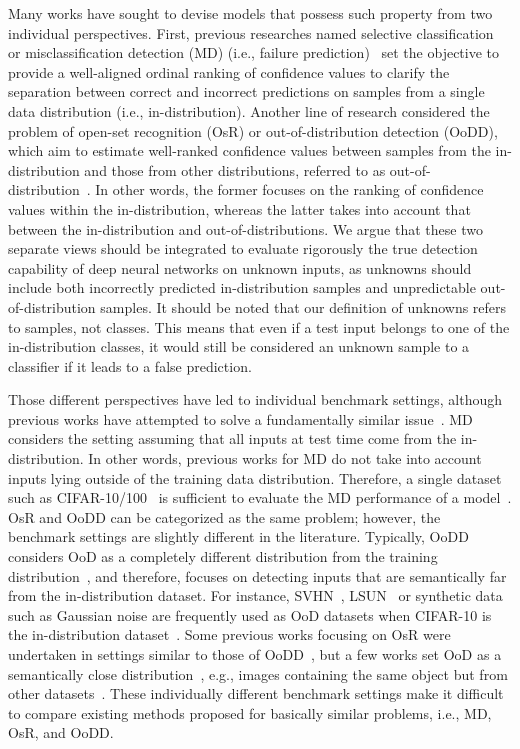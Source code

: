 \documentclass[preprint,12pt]{elsarticle}
\begin{document}
Many works have sought to devise models that possess such property from two individual perspectives. First, previous researches named selective classification~\citep{el2010selective, geifman2017selective} or misclassification detection (MD) (i.e., failure prediction)~\citep{jiang2018trust, corbiere2019addressing} set the objective to provide a well-aligned ordinal ranking of confidence values to clarify the separation between correct and incorrect predictions on samples from a single data distribution (i.e., in-distribution).
Another line of research considered the problem of open-set recognition (OsR) or out-of-distribution detection (OoDD), which aim to estimate well-ranked confidence values between samples from the in-distribution and those from other distributions, referred to as out-of-distribution~\citep{bendale2016towards, liang2017enhancing, lee2018simple}. In other words, the former focuses on the ranking of confidence values within the in-distribution, whereas the latter takes into account that between the in-distribution and out-of-distributions. We argue that these two separate views should be integrated to evaluate rigorously the true detection capability of deep neural networks on unknown inputs, as unknowns should include both incorrectly predicted in-distribution samples and unpredictable out-of-distribution samples. It should be noted that our definition of unknowns refers to samples, not classes. This means that even if a test input belongs to one of the in-distribution classes, it would still be considered an unknown sample to a classifier if it leads to a false prediction.

Those different perspectives have led to individual benchmark settings, although previous works have attempted to solve a fundamentally similar issue~\citep{moon2020confidence}. MD considers the setting assuming that all inputs at test time come from the in-distribution. In other words, previous works for MD do not take into account inputs lying outside of the training data distribution. Therefore, a single dataset such as CIFAR-10/100~\citep{krizhevsky2009learning} is sufficient to evaluate the MD performance of a model~\citep{geifman2018bias, corbiere2020confidence}. OsR and OoDD can be categorized as the same problem; however, the benchmark settings are slightly different in the literature. Typically, OoDD considers OoD as a completely different distribution from the training distribution~\citep{lee2017training}, and therefore, focuses on detecting inputs that are semantically far from the in-distribution dataset. For instance, SVHN~\citep{Netzer2011svhn}, LSUN~\citep{yu2015lsun} or synthetic data such as Gaussian noise are frequently used as OoD datasets when CIFAR-10 is the in-distribution dataset~\citep{liang2017enhancing, lee2018simple}. Some previous works focusing on OsR were undertaken in settings similar to those of OoDD~\citep{oza2019cnnosr, perera2020genosr}, but a few works set OoD as a semantically close distribution~\citep{jang2020onerest, oza2019c2ae}, e.g., images containing the same object but from other datasets~\citep{perera2020genosr}. These individually different benchmark settings make it difficult to compare existing methods proposed for basically similar problems, i.e., MD, OsR, and OoDD.
\end{document}
